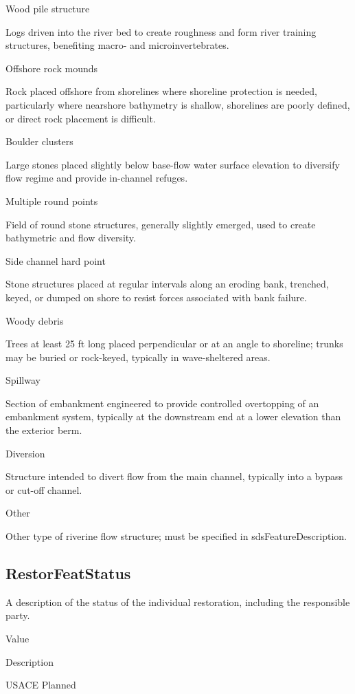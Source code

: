 \documentclass[
  letterpaper,
  DIV=11,
  numbers=noendperiod]{scrreprt}
\begin{document}
Wood pile structure

Logs driven into the river bed to create roughness and form river
training structures, benefiting macro- and microinvertebrates.

Offshore rock mounds

Rock placed offshore from shorelines where shoreline protection is
needed, particularly where nearshore bathymetry is shallow, shorelines
are poorly defined, or direct rock placement is difficult.

Boulder clusters

Large stones placed slightly below base-flow water surface elevation to
diversify flow regime and provide in-channel refuges.

Multiple round points

Field of round stone structures, generally slightly emerged, used to
create bathymetric and flow diversity.

Side channel hard point

Stone structures placed at regular intervals along an eroding bank,
trenched, keyed, or dumped on shore to resist forces associated with
bank failure.

Woody debris

Trees at least 25 ft long placed perpendicular or at an angle to
shoreline; trunks may be buried or rock-keyed, typically in
wave-sheltered areas.

Spillway

Section of embankment engineered to provide controlled overtopping of an
embankment system, typically at the downstream end at a lower elevation
than the exterior berm.

Diversion

Structure intended to divert flow from the main channel, typically into
a bypass or cut-off channel.

Other

Other type of riverine flow structure; must be specified in
sdsFeatureDescription.

\subsection{RestorFeatStatus}\label{restorfeatstatus-12}

A description of the status of the individual restoration, including the
responsible party.

Value

Description

USACE Planned
\end{document}
